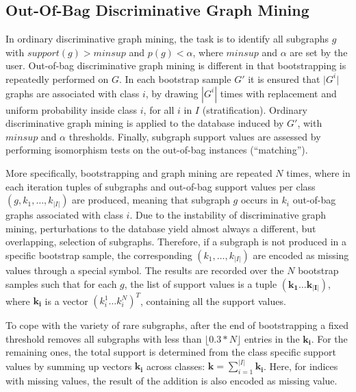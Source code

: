 \documentclass{sig-alternate}
\begin{document}
\subsection{Out-Of-Bag Discriminative Graph Mining}
\label{ss:oob-dgm}
In ordinary discriminative graph mining, the task is to identify all subgraphs
$g$ with $support(g)>minsup$ and $p(g)<\alpha$, where $minsup$ and $\alpha$ are
set by the user.
Out-of-bag discriminative graph mining is different in that bootstrapping is repeatedly performed on $G$.
In each bootstrap sample $G'$ it is ensured that $\vert G^i\vert$ graphs are associated with
class $i$, by drawing $|G^i|$ times with replacement and uniform probability inside 
class $i$, for all $i$ in $I$ (stratification). 
Ordinary discriminative graph mining is applied to the database induced by $G'$, with $minsup$ and $\alpha$ thresholds. 
Finally, subgraph support values are assessed by performing isomorphism
tests on the out-of-bag instances (``matching'').

More specifically, bootstrapping and graph mining are repeated $N$ times, where in each
iteration tuples of subgraphs and out-of-bag support values per class
$(g,k_1,\ldots,k_{\vert I\vert})$ are produced, meaning that subgraph $g$
occurs in $k_i$ out-of-bag graphs associated with class $i$. 
Due to the instability of discriminative graph mining, perturbations to the database yield almost
always a different, but overlapping, selection of subgraphs. 
Therefore, if a subgraph is not produced in a specific bootstrap sample, the corresponding
$(k_1,\ldots,k_{\vert I\vert})$ are encoded as missing values through a special symbol.
The results are
recorded over the $N$ bootstrap samples such that for each $g$, the list of
support values is a tuple $(\mathbf{k_1}\ldots\mathbf{k_{\vert I\vert}})$,
where $\mathbf{k_i}$ is a vector $(k_i^1\ldots k_i^N)^T$, containing all the
support values. 

To cope with the variety of rare subgraphs, after the end of bootstrapping a fixed threshold removes all subgraphs with less
than $\lfloor0.3*N\rfloor$ entries in the $\mathbf{k_i}$.
For the remaining ones, the total support is determined from the class specific support values by
summing up vectors $\mathbf{k_i}$ across classes:
$\mathbf{k}=\sum_{i=1}^{\vert I\vert} \mathbf{k_i}$. Here, for indices with missing values, the result of the addition is also encoded as missing value. 
\end{document}
